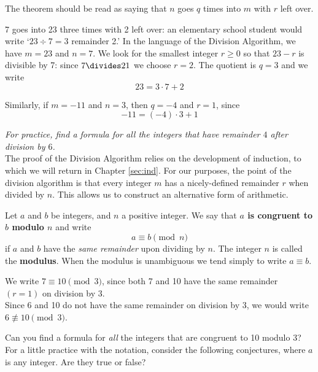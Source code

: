 \noindent The theorem should be read as saying that $n$ goes $q$ times into $m$ with $r$ left over. 

\begin{examples}
\item 7 goes into 23 three times with 2 left over: an elementary school student would write `$23\div 7=3$ remainder 2.' In the language of the Division Algorithm, we have $m=23$ and $n=7$. We look for the smallest integer $r\ge 0$ so that $23-r$ is divisible by 7: since $7\divides 21$ we choose $r=2$. The quotient is $q=3$ and we write
\[23=3\cdot 7+2\]
\item Similarly, if $m=-11$ and $n=3$, then $q=-4$ and $r=1$, since
\[-11=(-4)\cdot 3+1\] 
\end{examples}


\noindent\emph{For practice, find a formula for all the integers that have remainder $4$ after division by $6$.}\\


\noindent The proof of the Division Algorithm relies on the development of induction, to which we will return in Chapter \ref{sec:ind}. For our purposes, the point of the division algorithm is that every integer $m$ has a nicely-defined remainder $r$ when divided by $n$. This allows us to construct an alternative form of arithmetic.

\begin{defn}
Let $a$ and $b$ be integers, and $n$ a positive integer. We say that \textbf{$a$ is congruent to $b$ modulo $n$} and write
\[a\equiv b\pmod n\]
if $a$ and $b$ have the \emph{same remainder} upon dividing by $n$. The integer $n$ is called the \textbf{modulus}. When the modulus is unambiguous we tend simply to write $a\equiv b$.
\end{defn}

\begin{exs}
We write $7\equiv 10\pmod 3$, since both 7 and 10 have the same remainder $(r=1)$ on division by $3$.\\
Since 6 and 10 do not have the same remainder on division by 3, we would write $6\not\equiv 10\pmod 3$.
\end{exs}

\noindent Can you find a formula for \emph{all} the integers that are congruent to 10 modulo 3?\\

\noindent For a little practice with the notation, consider the following conjectures, where $a$ is any integer. Are they true or false? 

